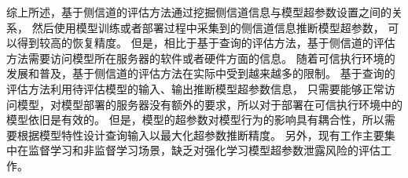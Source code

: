 综上所述，基于侧信道的评估方法通过挖掘侧信道信息与模型超参数设置之间的关系，
然后使用模型训练或者部署过程中采集到的侧信道信息推断模型超参数，
可以得到较高的恢复精度。
但是，相比于基于查询的评估方法，基于侧信道的评估方法需要访问模型所在服务器的软件或者硬件方面的信息。
随着可信执行环境的发展和普及，基于侧信道的评估方法在实际中受到越来越多的限制。
基于查询的评估方法利用待评估模型的输入、输出推断模型超参数信息，
只需要能够正常访问模型，对模型部署的服务器没有额外的要求，所以对于部署在可信执行环境中的模型依旧是有效的。
但是，模型的超参数对模型行为的影响具有耦合性，所以需要根据模型特性设计查询输入以最大化超参数推断精度。
另外，现有工作主要集中在监督学习和非监督学习场景，缺乏对强化学习模型超参数泄露风险的评估工作。












